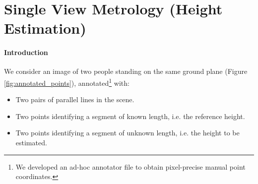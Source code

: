 \section{Single View Metrology (Height Estimation)}

\paragraph{Introduction} We consider an image of two people standing on the same ground plane (Figure \ref{fig:annotated_points}), annotated\footnote{We developed an ad-hoc annotator file to obtain pixel-precise manual point coordinates.} with:

\begin{itemize}
    \item Two pairs of parallel lines in the scene.
    \item Two points identifying a segment of known length, i.e. the reference height. 
    \item Two points identifying a segment of unknown length, i.e. the height to be estimated.
\end{itemize}

